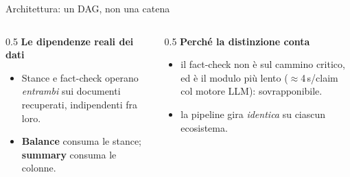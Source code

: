 \documentclass[aspectratio=169,11pt]{beamer}
\begin{document}
\begin{frame}{Architettura: un DAG, non una catena}
  \vspace{0.5em}
  \begin{columns}[T]
    \begin{column}{0.5\textwidth}
      \scriptsize
      \textbf{Le dipendenze reali dei dati}
      \begin{itemize}\scriptsize
        \item \alert{Stance} e \alert{fact-check} operano \emph{entrambi} sui documenti
              recuperati, indipendenti fra loro.
        \item \textbf{Balance} consuma le stance; \textbf{summary} consuma le colonne.
      \end{itemize}
    \end{column}
    \begin{column}{0.5\textwidth}
      \scriptsize
      \textbf{Perché la distinzione conta}
      \begin{itemize}\scriptsize
        \item il fact-check \alert{non è sul cammino critico}, ed è il modulo più lento
              ($\approx$4\,s/claim col motore LLM): sovrapponibile.
        \item la pipeline gira \emph{identica} su ciascun ecosistema.
      \end{itemize}
    \end{column}
  \end{columns}
\end{frame}
\end{document}
